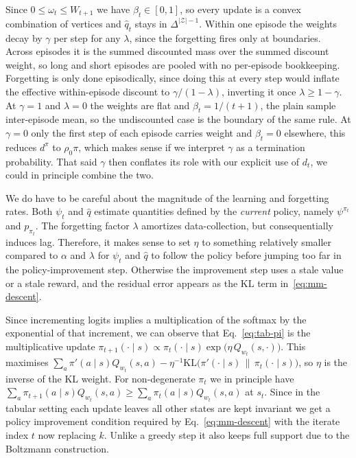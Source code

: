 \documentclass[11pt]{article}
\theoremstyle{remark}
\newcommand{\Zcal}{\mathcal Z}
\newcommand{\1}{\mathds{1}}
\newcommand{\occ}{d^{\pi}}
\newcommand{\new}[1]{\textcolor{blue!70!black}{#1}}
\begin{document}
Since $0\le\omega_t\le W_{t+1}$ we have $\beta_t\in[0,1]$, so every update is a convex combination of vertices and $\hat q_t$ stays in $\Delta^{|\Zcal|-1}$.
Within one episode the weights decay by $\gamma$ per step for any $\lambda$, since the forgetting fires only at boundaries.
Across episodes it is the summed discounted mass over the summed discount weight, so long and short episodes are pooled with no per-episode bookkeeping.
Forgetting is only done episodically, since doing this at every step would inflate the effective within-episode discount to $\gamma/(1-\lambda)$, inverting it once $\lambda\ge1-\gamma$.
At $\gamma=1$ \new{and $\lambda=0$} the weights are flat and $\beta_t=1/(t+1)$, the plain sample inter-episode mean, so the undiscounted case is the boundary of the same rule.
At $\gamma=0$ only the first step of each episode carries weight and $\beta_t=0$ elsewhere, this reduces $\occ$ to $\rho_0\pi$, which makes sense if we interpret $\gamma$ as a termination probability.
That said $\gamma$ then conflates its role with our explicit use of $d_t$, we could in principle combine the two.

We do have to be careful about the magnitude of the learning and forgetting rates.
Both $\psi_t$ and $\hat q$ estimate quantities defined by the \emph{current} policy, namely $\psi^{\pi_t}$ and $p_{\pi_t}$.
The forgetting factor $\lambda$ amortizes data-collection, but consequentially induces lag.
Therefore, it makes sense to set $\eta$ to something relatively smaller compared to $\alpha$ and $\lambda$ for $\psi_t$ and $\hat q$ to follow the policy before jumping too far in the policy-improvement step.
Otherwise the improvement step uses a stale value or a stale reward, and the residual error appears as the $\mathrm{KL}$ term in~\eqref{eq:mm-descent}.

Since incrementing logits implies a multiplication of the softmax by the exponential of that increment, we can observe that Eq.~\eqref{eq:tab-pi} is the multiplicative update $\pi_{t+1}(\cdot\mid s)\propto\pi_t(\cdot\mid s)\exp\big(\eta\,Q_{w_t}(s,\cdot)\big)$.
This maximises $\sum_a\pi'(a\mid s)Q_{w_t}(s,a)-\eta^{-1}\mathrm{KL}\big(\pi'(\cdot\mid s)\,\|\,\pi_t(\cdot\mid s)\big)$, so $\eta$ is the inverse of the KL weight.
For non-degenerate $\pi_t$ we in principle have $\sum_a\pi_{t+1}(a\mid s)Q_{w_t}(s,a)\ge\sum_a\pi_t(a\mid s)Q_{w_t}(s,a)$ at $s_t$.
Since in the tabular setting each update leaves all other states are kept invariant we get a policy improvement condition required by Eq.~\eqref{eq:mm-descent} with the iterate index $t$ now replacing $k$.
Unlike a greedy step it also keeps full support due to the Boltzmann construction.
\end{document}
